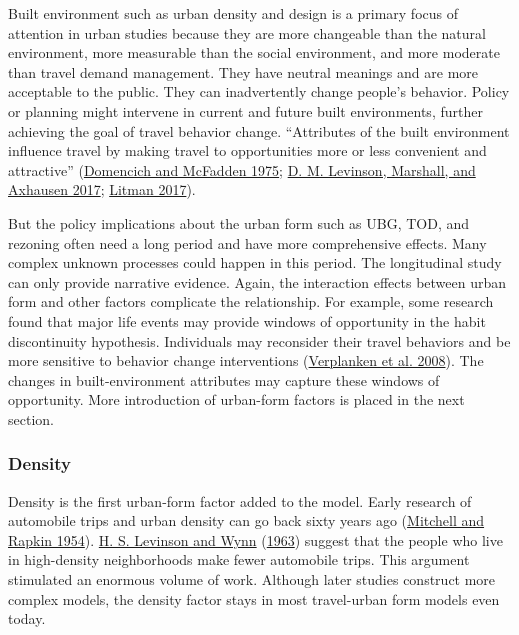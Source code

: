 \documentclass[
  12pt,
]{article}
\begin{document}
Built environment such as urban density and design is a primary focus of attention in urban studies because they are more changeable than the natural environment, more measurable than the social environment, and more moderate than travel demand management. They have neutral meanings and are more acceptable to the public. They can inadvertently change people's behavior. Policy or planning might intervene in current and future built environments, further achieving the goal of travel behavior change. ``Attributes of the built environment influence travel by making travel to opportunities more or less convenient and attractive'' (\protect\hyperlink{ref-domencichURBANTRAVELDEMAND1975}{Domencich and McFadden 1975}; \protect\hyperlink{ref-levinsonElementsAccessTransport2017}{D. M. Levinson, Marshall, and Axhausen 2017}; \protect\hyperlink{ref-litmanHowLandUse2017}{Litman 2017}).

But the policy implications about the urban form such as UBG, TOD, and rezoning often need a long period and have more comprehensive effects. Many complex unknown processes could happen in this period. The longitudinal study can only provide narrative evidence. Again, the interaction effects between urban form and other factors complicate the relationship. For example, some research found that major life events may provide windows of opportunity in the habit discontinuity hypothesis. Individuals may reconsider their travel behaviors and be more sensitive to behavior change interventions (\protect\hyperlink{ref-verplankenContextChangeTravel2008}{Verplanken et al. 2008}). The changes in built-environment attributes may capture these windows of opportunity. More introduction of urban-form factors is placed in the next section.

\hypertarget{density}{%
\subsubsection{Density}\label{density}}

Density is the first urban-form factor added to the model. Early research of automobile trips and urban density can go back sixty years ago (\protect\hyperlink{ref-mitchellUrbanTraffic1954}{Mitchell and Rapkin 1954}). \protect\hyperlink{ref-levinsonEFFECTSDENSITYURBAN1963}{H. S. Levinson and Wynn} (\protect\hyperlink{ref-levinsonEFFECTSDENSITYURBAN1963}{1963}) suggest that the people who live in high-density neighborhoods make fewer automobile trips. This argument stimulated an enormous volume of work. Although later studies construct more complex models, the density factor stays in most travel-urban form models even today.
\end{document}
